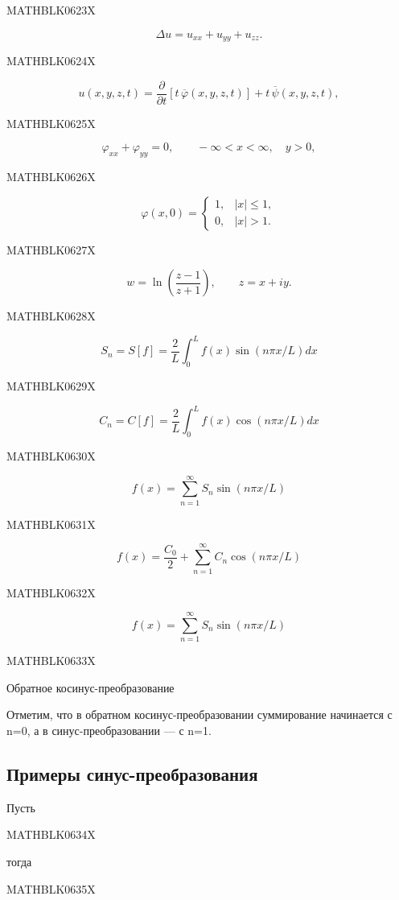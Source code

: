 \documentclass[
  ukrainian,
]{article}
\begin{document}
MATHBLK0623X

\[
\Delta u=u_{xx}+u_{yy}+u_{zz}.
\]

MATHBLK0624X

\[
u(x,y,z,t)=\frac{\partial}{\partial t}\!\left[t\,\overline{\varphi}(x,y,z,t)\right]+t\,\overline{\psi}(x,y,z,t),
\]

MATHBLK0625X

\[
\varphi_{xx} + \varphi_{yy} = 0, \qquad -\infty < x < \infty,\quad y > 0,
\]

MATHBLK0626X

\[
\varphi(x,0) =
\begin{cases}
1, & |x| \le 1, \\
0, & |x| > 1.
\end{cases}
\]

MATHBLK0627X

\[
w = \ln\!\left(\frac{z - 1}{z + 1}\right), \qquad z = x + iy.
\]

MATHBLK0628X

\[
S_n = S[f] = \frac{2}{L} \int_0^L f(x) \sin(n\pi x/L) dx
\]

MATHBLK0629X

\[
C_n = C[f] = \frac{2}{L} \int_0^L f(x) \cos(n\pi x/L) dx
\]

MATHBLK0630X

\[
f(x) = \sum_{n=1}^{\infty} S_n \sin(n\pi x/L)
\]

MATHBLK0631X

\[
f(x) = \frac{C_0}{2} + \sum_{n=1}^{\infty} C_n \cos(n\pi x/L)
\]

MATHBLK0632X

\[
f(x) = \sum_{n=1}^{\infty} S_n \sin(n\pi x/L)
\]

MATHBLK0633X

Обратное косинус-преобразование

Отметим, что в обратном косинус-преобразовании суммирование начинается с
n=0, а в синус-преобразовании --- с n=1.

\subsection{Примеры
синус-преобразования}\label{ux43fux440ux438ux43cux435ux440ux44b-ux441ux438ux43dux443ux441-ux43fux440ux435ux43eux431ux440ux430ux437ux43eux432ux430ux43dux438ux44f-1}

Пусть

MATHBLK0634X

тогда

MATHBLK0635X
\end{document}
